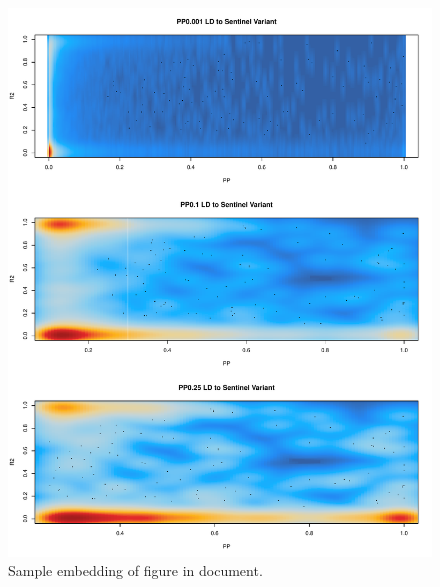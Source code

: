 \documentclass{article}\usepackage[]{graphicx}\usepackage[]{color}
\begin{document}
\begin{enumerate}[label=(\Alph*)]
\begin{figure}[H]
\centering
\includegraphics[width=\linewidth]{staticFigures/LDtoSentinel_PPcomparison.pdf}
\caption{Sample embedding of figure in document.}
\end{figure} 

\end{enumerate}
\end{document}
